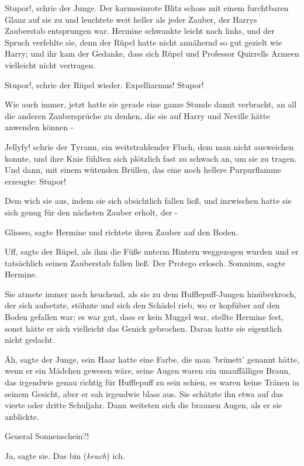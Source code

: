 \glqq{}Stupor!\grqq{}, schrie der Junge. Der karmesinrote Blitz schoss mit einem
furchtbaren Glanz auf sie zu und leuchtete weit heller als jeder Zauber, der
Harrys Zauberstab entsprungen war. Hermine schwankte leicht nach links, und der
Spruch verfehlte sie, denn der Rüpel hatte nicht annähernd so gut gezielt wie
Harry; und ihr kam der Gedanke, dass sich Rüpel und Professor Quirrells Armeen
vielleicht nicht vertragen.

\glqq{}Stupor!\grqq{}, schrie der Rüpel wieder. \glqq{}Expelliarmus!
Stupor!\grqq{}

Wie auch immer, jetzt hatte sie gerade eine ganze Stunde damit verbracht, an all
die anderen Zaubersprüche zu denken, die sie auf Harry und Neville hätte
anwenden können -

\glqq{}Jellyfy!\grqq{} schrie der Tyrann, ein weitstrahlender Fluch, dem man
nicht ausweichen konnte, und ihre Knie fühlten sich plötzlich fast zu schwach
an, um sie zu tragen. Und dann, mit einem wütenden Brüllen, das eine noch
hellere Purpurflamme erzeugte: \glqq{}Stupor!\grqq{}

Dem wich sie aus, indem sie sich absichtlich fallen ließ, und inzwischen hatte
sie sich genug für den nächsten Zauber erholt, der -

\glqq{}Glisseo\grqq{}, sagte Hermine und richtete ihren Zauber auf den Boden.

\glqq{}Uff\grqq{}, sagte der Rüpel, als ihm die Füße unterm Hintern weggezogen
wurden und er tatsächlich seinen Zauberstab fallen ließ. Der Protego erlosch.
\glqq{}Somnium\grqq{}, sagte Hermine.

Sie atmete immer noch keuchend, als sie zu dem Hufflepuff-Jungen hinüberkroch,
der sich aufsetzte, stöhnte und sich den Schädel rieb, wo er kopfüber auf den
Boden gefallen war; es war gut, dass er kein Muggel war, stellte Hermine fest,
sonst hätte er sich vielleicht das Genick gebrochen. Daran hatte sie eigentlich
nicht gedacht.

\glqq{}Äh\grqq{}, sagte der Junge, sein Haar hatte eine Farbe, die man 'brünett'
genannt hätte, wenn er ein Mädchen gewesen wäre, seine Augen waren ein
unauffälliges Braun, das irgendwie genau richtig für Hufflepuff zu sein schien,
es waren keine Tränen in seinem Gesicht, aber er sah irgendwie blass aus. Sie
schätzte ihn etwa auf das vierte oder dritte Schuljahr. Dann weiteten sich die
braunen Augen, als er sie anblickte.

\glqq{}General Sonnenschein?!\grqq{}

\glqq{}Ja\grqq{}, sagte sie. \glqq{}Das bin (\emph{keuch}) ich.\grqq{}

